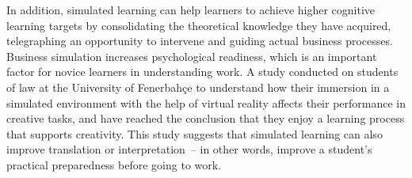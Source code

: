 \documentclass[output=paper]{langscibook}
\begin{document}

In addition, simulated learning can help learners to achieve higher cognitive learning targets by consolidating the theoretical knowledge they have acquired, telegraphing an opportunity to intervene and guiding actual business processes. Business simulation increases psychological readiness, which is an important factor for novice learners in understanding work. A study conducted on students of law at the University of Fenerbahçe \citep{Dogan2024} to understand how their immersion in a simulated environment with the help of virtual reality affects their performance in creative tasks, and have reached the conclusion that they enjoy a learning process that supports creativity. This study suggests that simulated learning can also improve translation or interpretation~-- in other words, improve a student's practical preparedness before going to work. 
\end{document}
